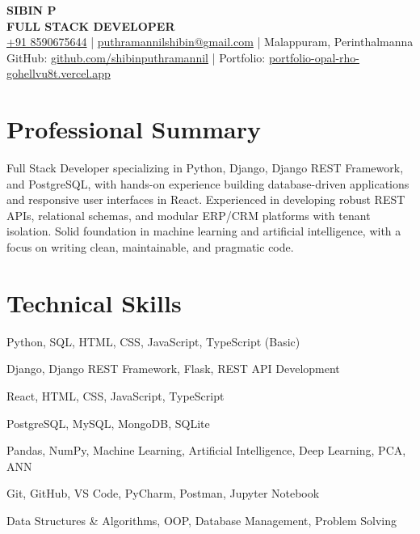 \documentclass[a4paper,9pt]{article}
\begin{document}
\begin{center}
    {\LARGE \textbf{SIBIN P}}\\[2pt]
    {\small \textbf{FULL STACK DEVELOPER}}\\[3pt]
    {\footnotesize
        \href{tel:+918590675644}{+91 8590675644} \enspace|\enspace
        \href{mailto:puthramannilshibin@gmail.com}{puthramannilshibin@gmail.com} \enspace|\enspace
        Malappuram, Perinthalmanna\\[2pt]
        GitHub: \href{https://github.com/shibinputhramannil}{github.com/shibinputhramannil} \enspace|\enspace
        Portfolio: \href{https://portfolio-opal-rho-gohellvu8t.vercel.app/}{portfolio-opal-rho-gohellvu8t.vercel.app}
    }
\end{center}

\vspace{-4pt}

\section*{Professional Summary}
Full Stack Developer specializing in Python, Django, Django REST Framework, and PostgreSQL, with hands-on experience building database-driven applications and responsive user interfaces in React. Experienced in developing robust REST APIs, relational schemas, and modular ERP/CRM platforms with tenant isolation. Solid foundation in machine learning and artificial intelligence, with a focus on writing clean, maintainable, and pragmatic code.

\section*{Technical Skills}
\begin{description}[noitemsep, topsep=1pt, leftmargin=75pt, font=\normalfont\textbf]
    \item[Programming:] Python, SQL, HTML, CSS, JavaScript, TypeScript (Basic)
    \item[Backend:] Django, Django REST Framework, Flask, REST API Development
    \item[Frontend:] React, HTML, CSS, JavaScript, TypeScript
    \item[Databases:] PostgreSQL, MySQL, MongoDB, SQLite
    \item[Data \& AI:] Pandas, NumPy, Machine Learning, Artificial Intelligence, Deep Learning, PCA, ANN
    \item[Tools:] Git, GitHub, VS Code, PyCharm, Postman, Jupyter Notebook
    \item[Core:] Data Structures \& Algorithms, OOP, Database Management, Problem Solving
\end{description}
\end{document}
